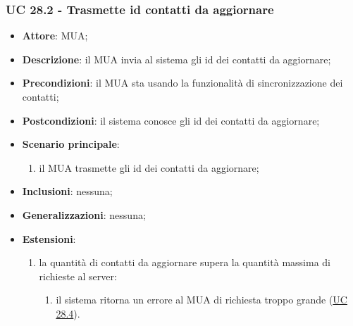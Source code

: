     \subsubsection{UC 28.2 - Trasmette id contatti da aggiornare} \label{sec:UC28.2}
    \begin{itemize}
        \item \textbf{Attore}: MUA;
        \item \textbf{Descrizione}: il MUA invia al sistema gli id dei contatti da aggiornare;
        \item \textbf{Precondizioni}: il MUA sta usando la funzionalità di sincronizzazione dei contatti;
        \item \textbf{Postcondizioni}: il sistema conosce gli id dei contatti da aggiornare;
        \item \textbf{Scenario principale}:
            \begin{enumerate}
                \item il MUA trasmette gli id dei contatti da aggiornare;
            \end{enumerate}
        \item \textbf{Inclusioni}: nessuna;
        \item \textbf{Generalizzazioni}: nessuna;
        \item \textbf{Estensioni}:
            \begin{enumerate}[label=\alph*.]
                \item la quantità di contatti da aggiornare supera la quantità massima di richieste al server:
                \begin{enumerate}[label=\arabic*.]
                    \item il sistema ritorna un errore al MUA di richiesta troppo grande (\hyperref[sec:UC28.4]{UC 28.4}).
                \end{enumerate}
            \end{enumerate}
    \end{itemize}


